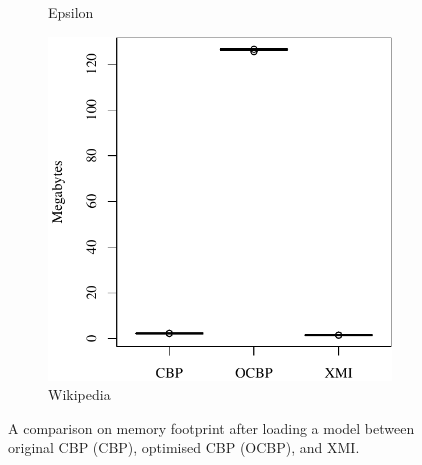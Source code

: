 \documentclass{llncs}
\begin{document}
\begin{figure}[ht]
\begin{subfigure}{0.325\textwidth}
            \caption{Epsilon}
            \label{fig:load_memory_epsilon}
        \end{subfigure}
        \hfill
        \begin{subfigure}{0.325\textwidth}
            \centering
            \includegraphics[width=\linewidth]{images/load_memory_wikipedia}
            \caption{Wikipedia}
            \label{fig:load_memory_wikipedia}
        \end{subfigure}
        \caption{A comparison on memory footprint after loading a model between original CBP (CBP), optimised CBP (OCBP), and XMI.}
        \label{fig:loadmemory}
    \end{figure}
\end{document}
